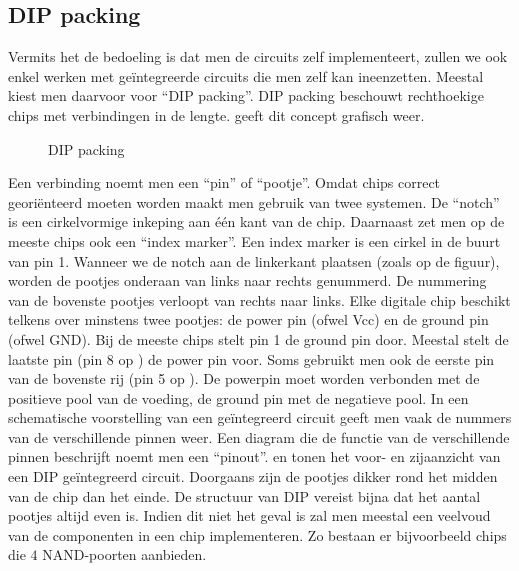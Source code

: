 \subsection{DIP packing}
Vermits het de bedoeling is dat men de circuits zelf implementeert, zullen we ook enkel werken met ge\"integreerde circuits die men zelf kan ineenzetten. Meestal kiest men daarvoor voor ``DIP packing''. DIP packing beschouwt rechthoekige chips met verbindingen in de lengte.  geeft dit concept grafisch weer.
\begin{figure}[hbt]
\centering
{}
\caption{DIP packing}
\end{figure}
Een verbinding noemt men een ``pin'' of ``pootje''. Omdat chips correct geori\"enteerd moeten worden maakt men gebruik van twee systemen. De ``notch'' is een cirkelvormige inkeping aan \'e\'en kant van de chip. Daarnaast zet men op de meeste chips ook een ``index marker''. Een index marker is een cirkel in de buurt van pin 1. Wanneer we de notch aan de linkerkant plaatsen (zoals op de figuur), worden de pootjes onderaan van links naar rechts genummerd. De nummering van de bovenste pootjes verloopt van rechts naar links. Elke digitale chip beschikt telkens over minstens twee pootjes: de power pin (ofwel \mbox{Vcc}) en de ground pin (ofwel \mbox{GND}). Bij de meeste chips stelt pin 1 de ground pin door. Meestal stelt de laatste pin (pin 8 op ) de power pin voor. Soms gebruikt men ook de eerste pin van de bovenste rij (pin 5 op ). De powerpin moet worden verbonden met de positieve pool van de voeding, de ground pin met de negatieve pool. In een schematische voorstelling van een ge\"integreerd circuit geeft men vaak de nummers van de verschillende pinnen weer. Een diagram die de functie van de verschillende pinnen beschrijft noemt men een ``pinout''.  en  tonen het voor- en zijaanzicht van een DIP ge\"integreerd circuit. Doorgaans zijn de pootjes dikker rond het midden van de chip dan het einde. De structuur van DIP vereist bijna dat het aantal pootjes altijd even is. Indien dit niet het geval is zal men meestal een veelvoud van de componenten in een chip implementeren. Zo bestaan er bijvoorbeeld chips die $4$ NAND-poorten aanbieden.
